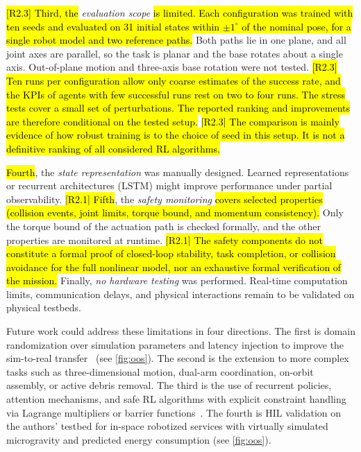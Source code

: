 \documentclass{ieeeaccess}
\newcommand{\hlone}[1]{{\sethlcolor{rone}\hl{#1}}}
\begin{document}
\hlone{[R2.3] Third, the}
\emph{evaluation scope} \hlone{is limited. Each configuration was trained with ten seeds and evaluated on
31 initial states within $\pm 1^\circ$ of the nominal pose, for a single robot model and two reference
paths.} Both paths lie in one plane, and all joint axes are parallel, so the task is planar
and the base rotates about a single axis. Out-of-plane motion and three-axis base rotation were not
tested. \hlone{[R2.3] Ten runs per configuration allow only coarse estimates of the success rate, and the
KPIs of agents with few successful runs rest on two to four runs. The stress tests cover a small set of
perturbations. The reported ranking and improvements are therefore conditional on the tested setup.}
\hlone{[R2.3] The comparison is mainly evidence of how robust training is to the choice of seed in this
setup. It is not a definitive ranking of all considered RL algorithms.}

\hlone{Fourth}, the \emph{state representation} was manually designed. Learned representations or recurrent
architectures (LSTM) might improve performance under partial observability. \hlone{[R2.1] Fifth}, the
\emph{safety monitoring} \hlone{covers selected properties (collision events, joint limits, torque bound,
and momentum consistency).} Only the torque bound of the actuation path is checked formally,
and the other properties are monitored at runtime. \hlone{[R2.1] The safety components do not constitute
a formal proof of closed-loop stability, task completion, or collision avoidance for the full nonlinear
model, nor an exhaustive formal verification of the mission.} Finally, \emph{no hardware
testing} was performed. Real-time computation limits, communication delays, and physical interactions
remain to be validated on physical testbeds.

Future work could address these limitations in four directions. The first is domain randomization over
simulation parameters and latency injection to improve the sim-to-real transfer~\cite{b8} (see
\cref{fig:oos}). The second is the extension to more complex tasks such as three-dimensional
motion, dual-arm coordination, on-orbit assembly, or active debris removal. The third is the use of
recurrent policies, attention mechanisms, and safe RL algorithms with explicit constraint handling via
Lagrange multipliers or barrier functions~\cite{b22,b24,b23,b34}. The fourth is HIL validation on the
authors' testbed for in-space robotized services with virtually simulated microgravity and
predicted energy consumption (see \cref{fig:oos}).
\end{document}
